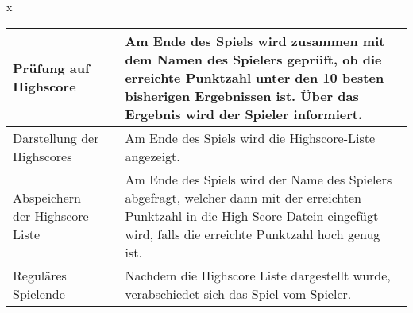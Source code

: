 \documentclass[a4paper]{article}
\begin{document}
\begin{exercise}{x}
\begin{center}
\begin{tabular}{| p{2.5cm} | p{2.2cm} | p{10cm} |}
		Pr\"ufung auf Highscore &
		& Am Ende des Spiels wird zusammen mit dem Namen des Spielers gepr\"uft,
		ob die erreichte Punktzahl unter den 10 besten bisherigen Ergebnissen ist. \"Uber
		das Ergebnis wird der Spieler informiert. \\ \hline

		Darstellung der Highscores &
		& Am Ende des Spiels wird die Highscore-Liste angezeigt.\\ \hline
				
		Abspeichern der Highscore-Liste &
		& Am Ende des Spiels wird der Name des Spielers abgefragt, welcher dann mit der
		erreichten Punktzahl in die High-Score-Datein eingef\"ugt wird, falls die erreichte
		Punktzahl hoch genug ist. \\ \hline
		
		Regul\"ares Spielende &
		& Nachdem die Highscore Liste dargestellt wurde, verabschiedet sich das Spiel vom Spieler.
		\\ \hline
		
	\end{tabular}
\end{center}

\end{exercise}


\end{document}
